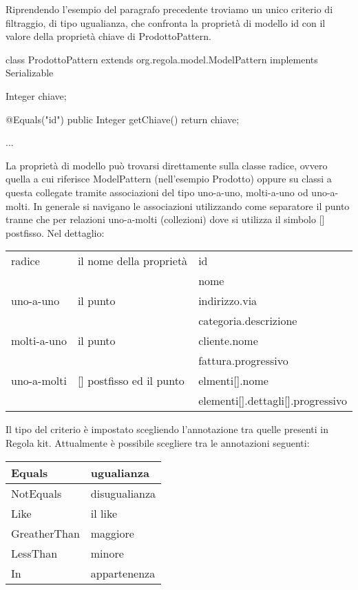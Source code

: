 Riprendendo l'esempio del paragrafo precedente troviamo un unico criterio di filtraggio, di tipo ugualianza, che confronta la proprietà di modello id con il valore della proprietà chiave di ProdottoPattern.

\begin{java}
class ProdottoPattern extends org.regola.model.ModelPattern 
    implements Serializable {
    
    Integer  chiave;

    @Equals("id")
    public Integer getChiave() {
        return chiave;
    }

    ...
}
\end{java}

La proprietà di modello può trovarsi direttamente sulla classe radice, ovvero quella a cui riferisce ModelPattern (nell'esempio Prodotto) oppure su classi a questa collegate tramite associazioni del tipo uno-a-uno, molti-a-uno od uno-a-molti. In generale si navigano le associazioni utilizzando come separatore il punto tranne che per relazioni uno-a-molti (collezioni) dove si utilizza il simbolo [] postfisso. Nel dettaglio:

\begin{center}
{
  \begin{tabular}{ | l | l | l  | }
  \hline
  radice  & il nome della proprietà & id \\   
                                    & & nome \\   \hline
  uno-a-uno  & il punto    & indirizzo.via \\   
                         & & categoria.descrizione \\   \hline
  molti-a-uno  & il punto    & cliente.nome \\   
                           & & fattura.progressivo \\   \hline
  uno-a-molti  & [] postfisso ed il punto    & elmenti[].nome \\   
                                           & & elementi[].dettagli[].progressivo \\   \hline
  \end{tabular}
}
\end{center}

Il tipo del criterio è impostato scegliendo l'annotazione tra quelle presenti in Regola kit. Attualmente è possibile scegliere tra le annotazioni seguenti:

\begin{center}
{
  \begin{tabular}{ | l | l  | }
  \hline
    Equals & ugualianza \\ \hline
    NotEquals & disugualianza \\ \hline
    Like & il like \\ \hline
    GreatherThan & maggiore \\ \hline 
    LessThan & minore \\ \hline
    In & appartenenza \\ \hline
  \end{tabular}
}
\end{center}

